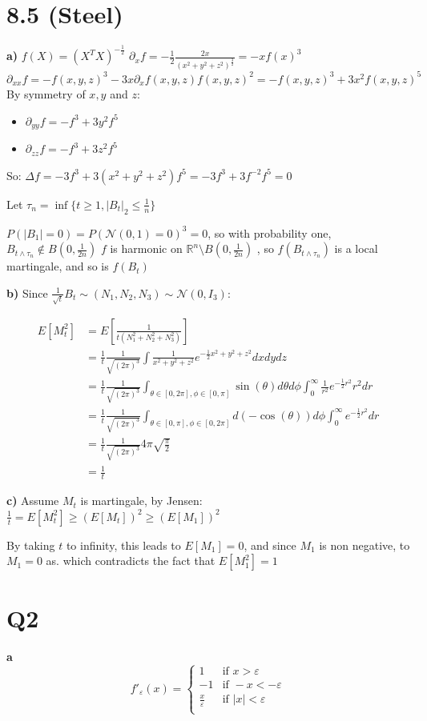 \documentclass[11pt]{article}
\begin{document}
\section{8.5 (Steel)}
\label{sec:orgheadline3}
\textbf{a)}
\(f(X) = (X^TX)^{-\frac12}\)
\(\partial_x f = -\frac12 \frac{2x}{(x^2+y^2+z^2)^{\frac32}} = -x f(x)^3\)
\(\partial_{xx}f = -f(x, y, z)^3 - 3 x \partial_x f(x, y, z) f(x, y, z)^2 = -f(x, y, z)^3 + 3 x^2 f(x, y, z)^5\)
By symmetry of \(x, y\) and \(z\):
\begin{itemize}
\item \(\partial_{yy}f = -f^3 + 3y^2f^5\)
\item \(\partial_{zz}f = -f^3 + 3z^2f^5\)
\end{itemize}
So:
\(\Delta f = -3 f^3 + 3 (x^2+y^2+z^2) f^5 = -3f^3 + 3f^{-2}f^5 = 0\)


Let \(\tau_n = \inf\{ t \ge 1, |B_t|_2 \le \frac1n \}\)

 \(P(|B_1| = 0) = P(\mathcal N(0,1) = 0)^3 = 0\), so with probability one, \(B_{t \wedge \tau_n} \not \in B(0, \frac1{2n})\)
\(f\) is harmonic on \(\mathbb R^n \setminus B(0, \frac1{2n})\) , so \(f(B_{t \wedge \tau_n})\) is a local martingale, and so is \(f(B_t)\)


\textbf{b)}
Since \(\frac1{\sqrt t} B_t \sim (N_1, N_2, N_3) \sim \mathcal N(0, I_3)\):

\begin{align*}
E[M_t^2] &= E[\frac1{t (N_1^2 + N_2^2 + N_3^2)} ]
\\&= \frac1t \frac1{\sqrt{(2\pi)^3}} \int \frac1{x^2+y^2+z^2} e^{-\frac12 x^2+y^2+z^2} dxdydz
\\&= \frac1t \frac1{\sqrt{(2\pi)^3}} \int_{\theta\in [0, 2\pi], \phi \in [0, \pi]}\sin(\theta)d\theta d\phi  \int_0^\infty \frac1{r^2} e^{-\frac12 r^2} r^2dr
\\&= \frac1t \frac1{\sqrt{(2\pi)^3}} \int_{\theta\in [0, \pi], \phi \in [0, 2\pi]}d(-\cos(\theta)) d\phi  \int_0^\infty e^{-\frac12 r^2} dr
\\&= \frac1t \frac1{\sqrt{(2\pi)^3}} 4\pi  \sqrt{\frac{\pi}2}
\\&= \frac1t
\end{align*}

\textbf{c)}
Assume \(M_t\) is martingale, by Jensen:
\(\frac1t = E[M_t^2] \ge (E[M_t])^2 \ge (E[M_1])^2\)

By taking \(t\) to infinity, this leads to \(E[M_1] = 0\), and since \(M_1\) is non negative, to \(M_1 = 0\) as. which contradicts the fact that \(E[M_1^2] = 1\)
\section{Q2}
\label{sec:orgheadline4}
\textbf{a}
\[f'_{\varepsilon}(x) = \left\{  \begin{array}{cc}
1 & \text{if } x > \varepsilon\\
-1 & \text{if } -x < -\varepsilon\\
\frac{x}{\varepsilon} & \text{if } |x| < \varepsilon\\
\end{array}\right.
\]
\end{document}
